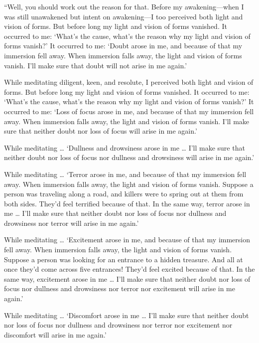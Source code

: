 \documentclass[12pt,openany]{book}%
\begin{document}
“Well, you should work out the reason for that. Before my awakening—when I was still unawakened but intent on awakening—I too perceived both light and vision of forms. But before long my light and vision of forms vanished. It occurred to me: ‘What’s the cause, what’s the reason why my light and vision of forms vanish?’ It occurred to me: ‘Doubt arose in me, and because of that my immersion fell away. When immersion falls away, the light and vision of forms vanish. I’ll make sure that doubt will not arise in me again.’ 

While meditating diligent, keen, and resolute, I perceived both light and vision of forms. But before long my light and vision of forms vanished. It occurred to me: ‘What’s the cause, what’s the reason why my light and vision of forms vanish?’ It occurred to me: ‘Loss of focus arose in me, and because of that my immersion fell away. When immersion falls away, the light and vision of forms vanish. I’ll make sure that neither doubt nor loss of focus will arise in me again.’ 

While meditating … ‘Dullness and drowsiness arose in me … I’ll make sure that neither doubt nor loss of focus nor dullness and drowsiness will arise in me again.’ 

While meditating … ‘Terror arose in me, and because of that my immersion fell away. When immersion falls away, the light and vision of forms vanish. Suppose a person was traveling along a road, and killers were to spring out at them from both sides. They’d feel terrified because of that. In the same way, terror arose in me … I’ll make sure that neither doubt nor loss of focus nor dullness and drowsiness nor terror will arise in me again.’ 

While meditating … ‘Excitement arose in me, and because of that my immersion fell away. When immersion falls away, the light and vision of forms vanish. Suppose a person was looking for an entrance to a hidden treasure. And all at once they’d come across five entrances! They’d feel excited because of that. In the same way, excitement arose in me … I’ll make sure that neither doubt nor loss of focus nor dullness and drowsiness nor terror nor excitement will arise in me again.’ 

While meditating … ‘Discomfort arose in me … I’ll make sure that neither doubt nor loss of focus nor dullness and drowsiness nor terror nor excitement nor discomfort will arise in me again.’ 
\end{document}
